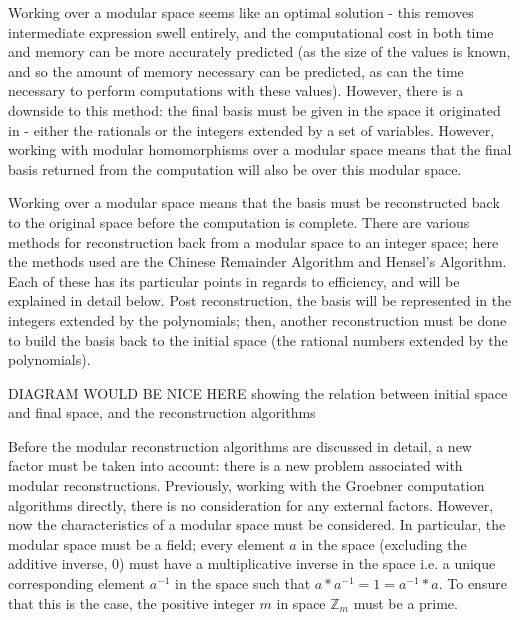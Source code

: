 \documentclass[letterpaper,12pt,titlepage,oneside,final]{book}
\begin{document}
Working over a modular space seems like an optimal solution - this removes intermediate expression swell entirely, and the computational cost in both time and memory can be more accurately predicted (as the size of the values is known, and so the amount of memory necessary can be predicted, as can the time necessary to perform computations with these values).  However, there is a downside to this method: the final basis must be given in the space it originated in - either the rationals or the integers extended by a set of variables.  However, working with modular homomorphisms over a modular space means that the final basis returned from the computation will also be over this modular space.  

Working over a modular space means that the basis must be reconstructed back to the original space before the computation is complete.  There are various methods for reconstruction back from a modular space to an integer space; here the methods used are the Chinese Remainder Algorithm and Hensel's Algorithm.  Each of these has its particular points in regards to efficiency, and will be explained in detail below.  Post reconstruction, the basis will be represented in the integers extended by the polynomials; then, another reconstruction must be done to build the basis back to the initial space (the rational numbers extended by the polynomials).    

DIAGRAM WOULD BE NICE HERE showing the relation between initial space and final space, and the reconstruction algorithms

Before the modular reconstruction algorithms are discussed in detail, a new factor must be taken into account: there is a new problem associated with modular reconstructions.  Previously, working with the Groebner computation algorithms directly, there is no consideration for any external factors.  However, now the characteristics of a modular space must be considered.  In particular, the modular space must be a field; every element ${a}$ in the space (excluding the additive inverse, 0) must have a multiplicative inverse in the space i.e. a unique corresponding element ${a^{-1}}$ in the space such that ${a*a^{-1} = 1 = a^{-1}*a}$.  To ensure that this is the case, the positive integer ${m}$ in space ${\mathbb{Z}_m}$ must be a prime.
\end{document}
